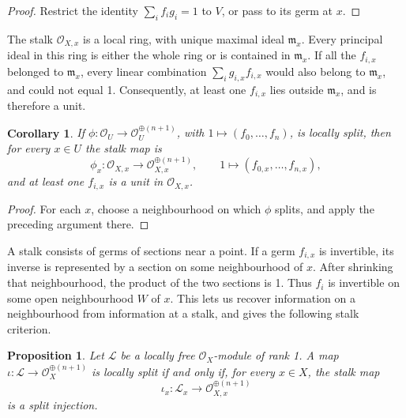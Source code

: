 \documentclass{article}
\theoremstyle{definition}
\theoremstyle{remark}
\theoremstyle{plain}
\newtheorem{proposition}{Proposition}[section]
\newtheorem{corollary}{Corollary}[section]
\begin{document}
\begin{proof}
    Restrict the identity \(\sum_i f_i g_i=1\) to \(V\), or pass to its germ
    at \(x\).
\end{proof}

The stalk \(\mathcal{O}_{X,x}\) is a local ring, with unique maximal ideal
\(\mathfrak{m}_x\). Every principal ideal in this ring is either the whole
ring or is contained in \(\mathfrak{m}_x\). If all the \(f_{i,x}\) belonged
to \(\mathfrak{m}_x\), every linear combination
\(\sum_i g_{i,x}f_{i,x}\) would also belong to \(\mathfrak{m}_x\), and could
not equal 1. Consequently, at least one \(f_{i,x}\) lies outside
\(\mathfrak{m}_x\), and is therefore a unit.

\begin{corollary}\label{cor:lsi-unit-at-stalks}
    If \(\phi:\mathcal{O}_U\to\mathcal{O}_U^{\oplus(n+1)}\), with
    \(1\mapsto(f_0,\dots,f_n)\), is locally split, then for every \(x\in U\)
    the stalk map is
    \[
        \phi_x:\mathcal{O}_{X,x}
        \longrightarrow\mathcal{O}_{X,x}^{\oplus(n+1)},
        \qquad 1\longmapsto(f_{0,x},\dots,f_{n,x}),
    \]
    and at least one \(f_{i,x}\) is a unit in \(\mathcal{O}_{X,x}\).
\end{corollary}

\begin{proof}
    For each \(x\), choose a neighbourhood on which \(\phi\) splits, and
    apply the preceding argument there.
\end{proof}

A stalk consists of germs of sections near a point. If a germ \(f_{i,x}\)
is invertible, its inverse is represented by a section on some
neighbourhood of \(x\). After shrinking that neighbourhood, the product
of the two sections is 1. Thus \(f_i\) is invertible on some open
neighbourhood \(W\) of \(x\). This lets us recover information on a
neighbourhood from information at a stalk, and gives the following stalk
criterion.

\begin{proposition}\label{prop:lsi-stalk-criterion}
    Let \(\mathcal{L}\) be a locally free \(\mathcal{O}_X\)-module of rank 1.
    A map
    \(\iota:\mathcal{L}\to\mathcal{O}_X^{\oplus(n+1)}\) is locally split
    if and only if, for every \(x\in X\), the stalk map
    \[
        \iota_x:\mathcal{L}_x
        \longrightarrow\mathcal{O}_{X,x}^{\oplus(n+1)}
    \]
    is a split injection.
\end{proposition}
\end{document}
